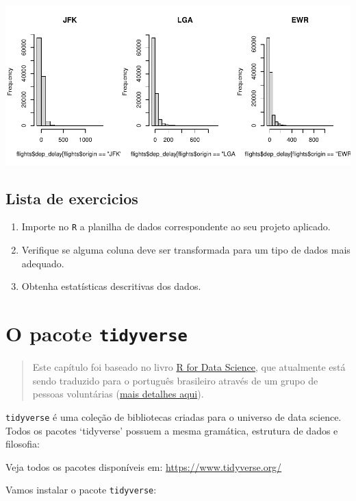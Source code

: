 \documentclass[
]{book}
\begin{document}
\includegraphics[width=1\linewidth]{AprendendoR_files/figure-latex/unnamed-chunk-32-1}

\section{Lista de exercicios}\label{lista-de-exercicios-1}

\begin{enumerate}
\def\labelenumi{\arabic{enumi}.}
\item
  Importe no \texttt{R} a planilha de dados correspondente ao seu projeto aplicado.
\item
  Verifique se alguma coluna deve ser transformada para um tipo de dados mais adequado.
\item
  Obtenha estatísticas descritivas dos dados.
\end{enumerate}

\chapter{\texorpdfstring{O pacote \texttt{tidyverse}}{O pacote tidyverse}}\label{o-pacote-tidyverse}

\begin{quote}
Este capítulo foi baseado no livro \href{https://r4ds.had.co.nz/}{R for Data Science}, que atualmente está sendo traduzido para o português brasileiro através de um grupo de pessoas voluntárias (\href{https://github.com/orgs/cienciadedatos/projects/2}{mais detalhes aqui}).
\end{quote}

\texttt{tidyverse} é uma coleção de bibliotecas criadas para o universo de data science.
Todos os pacotes `tidyverse' possuem a mesma gramática, estrutura de dados e filosofia:

Veja todos os pacotes disponíveis em: \url{https://www.tidyverse.org/}

Vamos instalar o pacote \texttt{tidyverse}:
\end{document}
